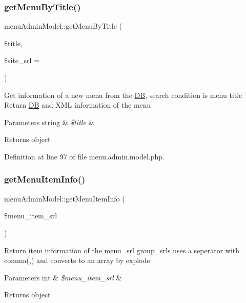 \subsubsection{\texorpdfstring{get\+Menu\+By\+Title()}{getMenuByTitle()}}
{\footnotesize\ttfamily menu\+Admin\+Model\+::get\+Menu\+By\+Title (\begin{DoxyParamCaption}\item[{}]{\$title,  }\item[{}]{\$site\+\_\+srl = {} }\end{DoxyParamCaption})}

Get information of a new menu from the \hyperlink{classDB}{DB}, search condition is menu title Return \hyperlink{classDB}{DB} and X\+ML information of the menu 
\begin{DoxyParams}[1]{Parameters}
string & {\em \$title} & \\
\hline
\end{DoxyParams}
\begin{DoxyReturn}{Returns}
object 
\end{DoxyReturn}


Definition at line 97 of file menu.\+admin.\+model.\+php.

\mbox{\label{classmenuAdminModel_a5686120035966f9a44ec2fea2af191e4}} 
\subsubsection{\texorpdfstring{get\+Menu\+Item\+Info()}{getMenuItemInfo()}}
{\footnotesize\ttfamily menu\+Admin\+Model\+::get\+Menu\+Item\+Info (\begin{DoxyParamCaption}\item[{}]{\$menu\+\_\+item\+\_\+srl }\end{DoxyParamCaption})}

Return item information of the menu\+\_\+srl group\+\_\+srls uses a seperator with comma(,) and converts to an array by explode 
\begin{DoxyParams}[1]{Parameters}
int & {\em \$menu\+\_\+item\+\_\+srl} & \\
\hline
\end{DoxyParams}
\begin{DoxyReturn}{Returns}
object 
\end{DoxyReturn}


